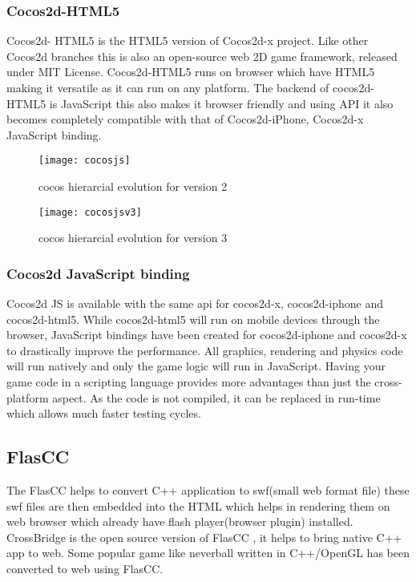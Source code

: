 \documentclass[23pt]{article}
\begin{document}
\subsubsection{Cocos2d-HTML5 }

{\Large Cocos2d- HTML5 is the HTML5 version of Cocos2d-x project. Like other Cocos2d branches this is also an open-source web 2D game framework, released under MIT License. Cocos2d-HTML5 runs on browser which have HTML5 making it versatile as it can run on any platform. The backend of cocos2d-HTML5 is JavaScript this also makes it browser friendly and using API it also becomes completely compatible with that of Cocos2d-iPhone, Cocos2d-x JavaScript binding. \par}

\begin{figure}[h]
\caption{cocos hierarcial evolution for version 2}
\centering
\texttt{[image: cocosjs]}
\end{figure}

\begin{figure}[h]
\caption{cocos hierarcial evolution for version 3}
\centering
\texttt{[image: cocosjsv3]}
\end{figure}

\subsubsection{Cocos2d JavaScript binding }
{\Large Cocos2d JS is available with the same api for cocos2d-x, cocos2d-iphone and cocos2d-html5. While cocos2d-html5 will run on mobile devices through the browser, JavaScript bindings have been created for cocos2d-iphone and cocos2d-x to drastically improve the performance. All graphics, rendering and physics code will run natively and only the game logic will run in JavaScript.
Having your game code in a scripting language provides more advantages than just the cross-platform aspect. As the code is not compiled, it can be replaced in run-time which allows much faster testing cycles.  \par}

\subsection{FlasCC }
{\Large The FlasCC helps to convert C++ application to swf(small web format file) these swf files are then embedded into the HTML which helps in rendering them on web browser which already have flash player(browser plugin) installed. CrossBridge is the open source version of FlasCC , it helps to bring native C++ app to web. Some popular game like neverball written in C++/OpenGL has been converted to web using FlasCC. \par}
\end{document}
